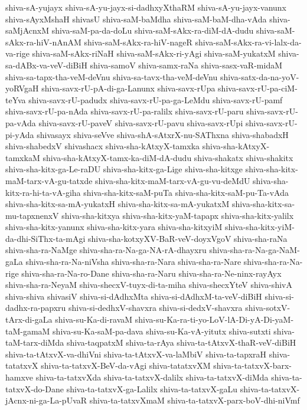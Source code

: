 {shiva-sA-yujayx
shiva-sA-yu-jayx-si-dadhxyXthaRM
shiva-sA-yu-jayx-vanunx
shiva-sAyxMshaH
shivasU
shiva-saM-baMdha
shiva-saM-baM-dha-vAda
shiva-saMjAcnxM
shiva-saM-pa-da-doLu
shiva-saM-sAkx-ra-diM-dA-dudu
shiva-saM-sAkx-ra-hiV-nAnAM
shiva-saM-sAkx-ra-hiV-nageR
shiva-saM-sAkx-ra-vi-lalx-da-va-rige
shiva-saM-sAkx-riNaH
shiva-saM-sAkx-ri-yAgi
shiva-saM-yukatxM
shiva-sa-dABx-va-veV-diBiH
shiva-samoV
shiva-samx-raNa
shiva-sasx-vaR-midaM
shiva-sa-tapx-tha-veM-deVnu
shiva-sa-tavx-tha-veM-deVnu
shiva-satx-da-na-yoV-yoRVgaH
shiva-savx-rU-pA-di-ga-Lanunx
shiva-savx-rUpa
shiva-savx-rU-pa-ciM-teYva
shiva-savx-rU-padudx
shiva-savx-rU-pa-ga-LeMdu
shiva-savx-rU-pamf
shiva-savx-rU-pa-nAda
shiva-savx-rU-pa-ralilx
shiva-savx-rU-paru
shiva-savx-rU-pa-vAda
shiva-savx-rU-paveV
shiva-savx-rU-pavu
shiva-savx-rUpi
shiva-savx-rU-pi-yAda
shivasayx
shiva-seVve
shiva-shA-sAtxrX-nu-SAThxna
shiva-shabadxH
shiva-shabedxV
shivashacx
shiva-sha-kAtxyX-tamxka
shiva-sha-kAtxyX-tamxkaM
shiva-sha-kAtxyX-tamx-ka-diM-dA-dudu
shiva-shakatx
shiva-shakitx
shiva-sha-kitx-ga-Le-raDU
shiva-sha-kitx-ga-Lige
shiva-sha-kitxge
shiva-sha-kitx-maM-tarx-vA-gu-tatxde
shiva-sha-kitx-maM-tarx-vA-gu-vu-deMdU
shiva-sha-kitx-ra-hi-ta-vA-giha
shiva-sha-kitx-saM-puTa
shiva-sha-kitx-saM-pu-Ta-vAda
shiva-sha-kitx-sa-mA-yukatxH
shiva-sha-kitx-sa-mA-yukatxM
shiva-sha-kitx-sa-mu-tapxnenxV
shiva-sha-kitxya
shiva-sha-kitx-yaM-tapapx
shiva-sha-kitx-yalilx
shiva-sha-kitx-yanunx
shiva-sha-kitx-yara
shiva-sha-kitxyiM
shiva-sha-kitx-yiM-da-dhi-SiThx-ta-mAgi
shiva-sha-kotxyXV-BaR-veV-doyxVgoV
shiva-sha-raNa
shiva-sha-ra-NaMge
shiva-sha-ra-Na-ga-NA-rA-dhayxru
shiva-sha-ra-Na-ga-NaM-gaLa
shiva-sha-ra-Na-niVsha
shiva-sha-ra-Nara
shiva-sha-ra-Nare
shiva-sha-ra-Na-rige
shiva-sha-ra-Na-ro-Dane
shiva-sha-ra-Naru
shiva-sha-ra-Ne-ninx-rayAyx
shiva-sha-ra-NeyaM
shiva-shecxV-tuyx-di-ta-miha
shiva-shecxYteV
shiva-shivA
shiva-shiva
shivasiV
shiva-si-dAdhxMta
shiva-si-dAdhxM-ta-veV-diBiH
shiva-si-dadhx-ra-papxru
shiva-si-dedhxV-shavxra
shiva-si-dedxV-shavxra
shiva-sotxV-tArx-di-gaLa
shiva-su-Ka-di-ravaM
shiva-su-Ka-ra-ti-yo-LoV-lA-Di-yA-Di-yaM-taM-gamaM
shiva-su-Ka-saM-pa-dava
shiva-su-Ka-vA-yitutx
shiva-sutxti
shiva-taM-tarx-diMda
shiva-taqpatxM
shiva-ta-rAya
shiva-ta-tAtxvX-thaR-veV-diBiH
shiva-ta-tAtxvX-va-dhiVni
shiva-ta-tAtxvX-va-laMbiV
shiva-ta-tapxraH
shiva-tatatxvX
shiva-ta-tatxvX-BeV-da-vAgi
shiva-tatatxvXM
shiva-ta-tatxvX-barx-hamxve
shiva-ta-tatxvXda
shiva-ta-tatxvX-dalilx
shiva-ta-tatxvX-diMda
shiva-ta-tatxvX-do-Dane
shiva-ta-tatxvX-ga-Lalilx
shiva-ta-tatxvX-gaLu
shiva-ta-tatxvX-jAcnx-ni-ga-La-pUvaR
shiva-ta-tatxvXmaM
shiva-ta-tatxvX-parx-boV-dhi-niVmf
}
